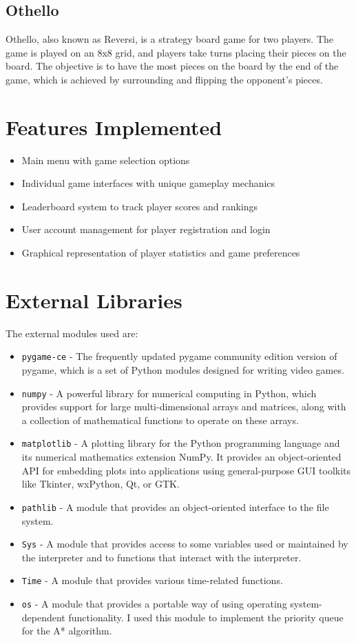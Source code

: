 \documentclass[12pt]{article}
\begin{document}
\subsection{Othello}
Othello, also known as Reversi, is a strategy board game for two players. The game is played on an 8x8 grid, and players take turns placing their pieces on the board. The objective is to have the most pieces on the board by the end of the game, which is achieved by surrounding and flipping the opponent's pieces.

\section{Features Implemented}
\begin{itemize}
    \item Main menu with game selection options
    \item Individual game interfaces with unique gameplay mechanics
    \item Leaderboard system to track player scores and rankings
    \item User account management for player registration and login
    \item Graphical representation of player statistics and game preferences
\end{itemize}

\section{External Libraries}
    The external modules used are:
    \begin{itemize}
        \item \texttt{pygame-ce} - The frequently updated pygame community edition version of pygame, which is a set of Python modules designed for writing video games.
        \item \texttt{numpy} - A powerful library for numerical computing in Python, which provides support for large multi-dimensional arrays and matrices, along with a collection of mathematical functions to operate on these arrays.
        \item \texttt{matplotlib} - A plotting library for the Python programming language and its numerical mathematics extension NumPy. It provides an object-oriented API for embedding plots into applications using general-purpose GUI toolkits like Tkinter, wxPython, Qt, or GTK.
        \item \texttt{pathlib} - A module that provides an object-oriented interface to the file system.
        \item \texttt{Sys} - A module that provides access to some variables used or maintained by the interpreter and to functions that interact with the interpreter.
        \item \texttt{Time} - A module that provides various time-related functions.
        \item \texttt{os} - A module that provides a portable way of using operating system-dependent functionality.
        I used this module to implement the priority queue for the A* algorithm.
    \end{itemize}
\end{document}
